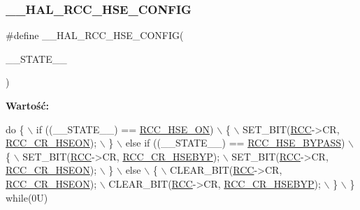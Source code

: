 \subsubsection{\texorpdfstring{\+\_\+\+\_\+\+H\+A\+L\+\_\+\+R\+C\+C\+\_\+\+H\+S\+E\+\_\+\+C\+O\+N\+F\+IG}{\_\_HAL\_RCC\_HSE\_CONFIG}}
{\footnotesize\ttfamily \#define \+\_\+\+\_\+\+H\+A\+L\+\_\+\+R\+C\+C\+\_\+\+H\+S\+E\+\_\+\+C\+O\+N\+F\+IG(\begin{DoxyParamCaption}\item[{}]{\+\_\+\+\_\+\+S\+T\+A\+T\+E\+\_\+\+\_\+ }\end{DoxyParamCaption})}

{\bfseries Wartość\+:}
\begin{DoxyCode}
\textcolor{keywordflow}{do} \{                                        \(\backslash\)
                      if ((\_\_STATE\_\_) == \hyperlink{group___r_c_c___h_s_e___config_gabc4f70a44776c557af20496b04d9a9db}{RCC\_HSE\_ON})            \(\backslash\)
                      \{                                         \(\backslash\)
                        SET\_BIT(\hyperlink{group___peripheral__declaration_ga74944438a086975793d26ae48d5882d4}{RCC}->CR, \hyperlink{group___peripheral___registers___bits___definition_gadb8228c9020595b4cf9995137b8c9a7d}{RCC\_CR\_HSEON});         \(\backslash\)
                      \}                                         \(\backslash\)
                      else \textcolor{keywordflow}{if} ((\_\_STATE\_\_) == \hyperlink{group___r_c_c___h_s_e___config_ga5ca515db2d5c4d5bdb9ee3d154df2704}{RCC\_HSE\_BYPASS})   \(\backslash\)
                      \{                                         \(\backslash\)
                        SET\_BIT(\hyperlink{group___peripheral__declaration_ga74944438a086975793d26ae48d5882d4}{RCC}->CR, \hyperlink{group___peripheral___registers___bits___definition_gaa3288090671af5a959aae4d7f7696d55}{RCC\_CR\_HSEBYP});        \(\backslash\)
                        SET\_BIT(\hyperlink{group___peripheral__declaration_ga74944438a086975793d26ae48d5882d4}{RCC}->CR, \hyperlink{group___peripheral___registers___bits___definition_gadb8228c9020595b4cf9995137b8c9a7d}{RCC\_CR\_HSEON});         \(\backslash\)
                      \}                                         \(\backslash\)
                      else                                      \(\backslash\)
                      \{                                         \(\backslash\)
                        CLEAR\_BIT(\hyperlink{group___peripheral__declaration_ga74944438a086975793d26ae48d5882d4}{RCC}->CR, \hyperlink{group___peripheral___registers___bits___definition_gadb8228c9020595b4cf9995137b8c9a7d}{RCC\_CR\_HSEON});       \(\backslash\)
                        CLEAR\_BIT(\hyperlink{group___peripheral__declaration_ga74944438a086975793d26ae48d5882d4}{RCC}->CR, \hyperlink{group___peripheral___registers___bits___definition_gaa3288090671af5a959aae4d7f7696d55}{RCC\_CR\_HSEBYP});      \(\backslash\)
                      \}                                         \(\backslash\)
                    \} \textcolor{keywordflow}{while}(0U)
\end{DoxyCode}


